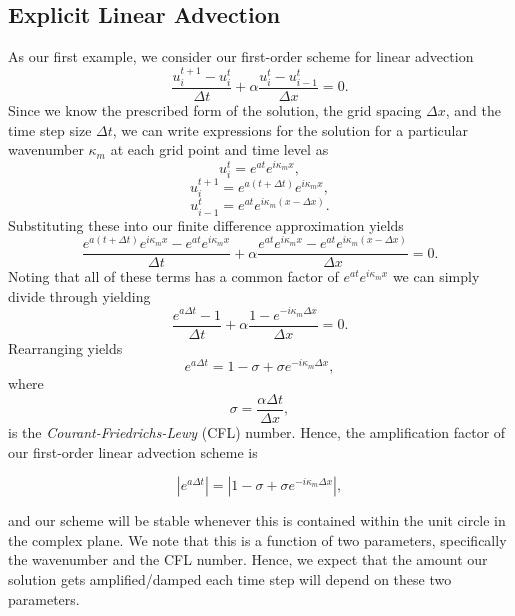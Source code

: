 \subsection{Explicit Linear Advection}
As our first example, we consider our first-order scheme for linear advection
\begin{equation}
	\frac{u_i^{t+1} - u_{i}^t}{\Delta t} +  \alpha \frac{u_i^t - u_{i-1}^t}{\Delta x} = 0.
\end{equation}
Since we know the prescribed form of the solution, the grid spacing $\Delta x$, and the time step size $\Delta t$, we can write expressions for the solution for a particular wavenumber $\kappa_m$ at each grid point and time level as
\begin{equation}
	u_{i}^t = e^{at} e^{i \kappa_m x},
\end{equation}
\begin{equation}
	u_{i}^{t+1} = e^{a(t+\Delta t)} e^{i \kappa_m x},
\end{equation}
\begin{equation}
	u_{i-1}^t = e^{at} e^{i \kappa_m (x-\Delta x)}.
\end{equation}
Substituting these into our finite difference approximation yields
\begin{equation}
	\frac{e^{a(t+\Delta t)} e^{i \kappa_m x} - e^{at} e^{i \kappa_m x}}{\Delta t} +  \alpha \frac{e^{at} e^{i \kappa_m x} - e^{at} e^{i \kappa_m (x-\Delta x)}}{\Delta x} = 0.
\end{equation}
Noting that all of these terms has a common factor of $e^{at} e^{i \kappa_m x}$ we can simply divide through yielding
\begin{equation}
	\frac{e^{a\Delta t} - 1}{\Delta t} +  \alpha \frac{1 - e^{-i \kappa_m \Delta x}}{\Delta x} = 0.
\end{equation}
Rearranging yields
\begin{equation}
	e^{a\Delta t} = 1 - \sigma + \sigma e^{-i \kappa_m \Delta x},
\end{equation}
where
\begin{equation}
	\sigma = \frac{\alpha \Delta t}{\Delta x},
\end{equation}
is the {\it Courant-Friedrichs-Lewy} (CFL) number. Hence, the amplification factor of our first-order linear advection scheme is 
\begin{eqBox}
\begin{equation}
	|e^{a\Delta t}| = |1 - \sigma + \sigma e^{-i \kappa_m \Delta x}|,
\end{equation}
\end{eqBox}
and our scheme will be stable whenever this is contained within the unit circle in the complex plane. We note that this is a function of two parameters, specifically the wavenumber and the CFL number. Hence, we expect that the amount our solution gets amplified/damped each time step will depend on these two parameters.


